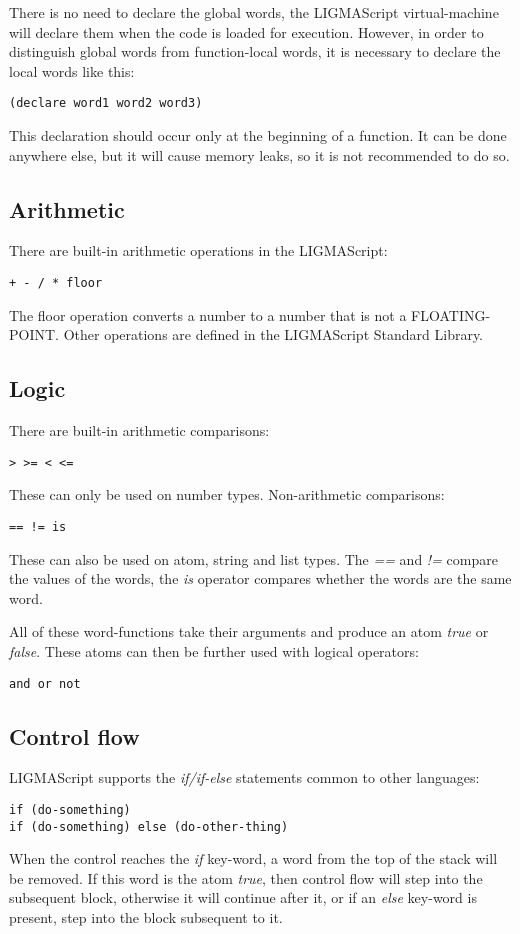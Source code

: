 \documentclass[12pt]{article}
\begin{document}
There is no need to declare the global words, the LIGMAScript virtual-machine will declare them when the 
code is loaded for execution.
However, in order to distinguish global words from function-local words, it is necessary to declare the 
local words like this:
\begin{verbatim}(declare word1 word2 word3)\end{verbatim}
This declaration should occur only at the beginning of a function. It can be done anywhere else, but it 
will cause memory leaks, so it is not recommended to do so.

\subsection{Arithmetic}
There are built-in arithmetic operations in the LIGMAScript:
\begin{verbatim}+ - / * floor\end{verbatim}
The floor operation converts a number to a number that is not a FLOATING-POINT. Other operations are 
defined in the LIGMAScript Standard Library.

\subsection{Logic}
There are built-in arithmetic comparisons:
\begin{verbatim}> >= < <= \end{verbatim}
These can only be used on number types.
Non-arithmetic comparisons:
\begin{verbatim}== != is\end{verbatim}
These can also be used on atom, string and list types. The \emph{==} and \emph{!=} compare the values of the words, 
the \emph{is} operator compares whether the words are the same word.

All of these word-functions take their arguments and produce an atom \emph{true} or \emph{false}. These atoms can
then be further used with logical operators:
\begin{verbatim}and or not\end{verbatim}

\subsection{Control flow}
LIGMAScript supports the \emph{if/if-else} statements common to other languages:
\begin{verbatim}
if (do-something)
if (do-something) else (do-other-thing)
\end{verbatim}
When the control reaches the \emph{if} key-word, a word from the top of the stack will be removed. If this word is the atom \emph{true}, 
then control flow will step into the subsequent block, 
otherwise it will continue after it, or if an \emph{else} key-word is present, step into the block subsequent to it.
\end{document}
